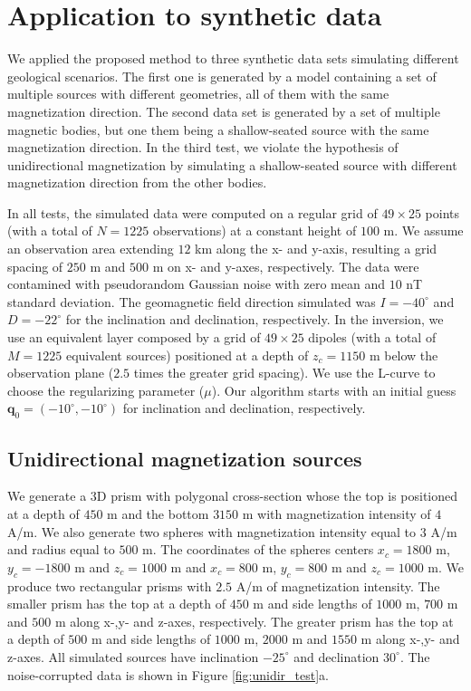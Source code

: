 \section{Application to synthetic data}
\label{sec:synt_tests}

We applied the proposed method to three synthetic data sets simulating different geological scenarios. The first one is generated by a model containing a set of multiple sources with different geometries, all of them with the same magnetization direction. The second data set is generated by a set of multiple magnetic bodies, but one them being a shallow-seated source with the same magnetization direction. In the third test, we violate the hypothesis of unidirectional magnetization by simulating a shallow-seated source with different magnetization direction from the other bodies.

In all tests, the simulated data were computed on a regular grid of $49 \times 25$ points (with a total of $N = 1225$ observations) at a constant height of $100$ m.  We assume an observation area extending $12$ km along the x- and y-axis, resulting a grid spacing of $250$ m and $500$ m on x- and y-axes, respectively. The data were contamined with pseudorandom Gaussian noise with zero mean and $10$ nT standard deviation. The geomagnetic field direction simulated was $I= -40^\circ$ and $D= -22^\circ$ for the inclination and declination, respectively. In the inversion, we use an equivalent layer composed by a grid of $49 \times 25$ dipoles (with a total of $M = 1225$ equivalent sources) positioned at a depth of $z_c = 1150$ m below the observation plane ($2.5$ times the greater grid spacing). We use the L-curve to choose the regularizing parameter ($\mu$). Our algorithm starts with an initial guess $\mathbf{q}_0 = (-10^\circ,-10^\circ)$ for inclination and declination, respectively.

\subsection{Unidirectional magnetization sources}
 
We generate a 3D prism with polygonal cross-section whose the top is positioned at a depth of $450$ m and the bottom $3150$ m with magnetization intensity of $4$ A/m. We also generate two spheres with magnetization intensity equal to $3$ A/m and radius equal to $500$ m. The coordinates of the spheres centers $x_c = 1800$ m, $y_c = -1800$ m and $z_c = 1000$ m and $x_c = 800$ m, $y_c = 800$ m and $z_c= 1000$ m. We produce two rectangular prisms with $2.5$ A/m of magnetization intensity. The smaller prism has the top at a depth of $450$ m and side lengths of $1000$ m, $700$ m and $500$ m along x-,y- and z-axes, respectively. The greater prism has the top at a depth of $500$ m and side lengths of $1000$ m, $2000$ m and $1550$ m along x-,y- and z-axes. All simulated sources have inclination $-25^\circ$ and declination $30^\circ$. The noise-corrupted data is shown in Figure \ref{fig:unidir_test}a. 

